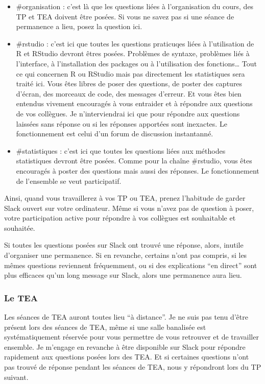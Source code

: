 \documentclass[a4paperpaper,]{article}
\providecommand{\tightlist}{%
  \setlength{\itemsep}{0pt}\setlength{\parskip}{0pt}}
\theoremstyle{definition}
\theoremstyle{definition}
\theoremstyle{definition}
\theoremstyle{remark}
\begin{document}
\begin{itemize}
\tightlist
\item
  \#organisation : c'est là que les questions liées à l'organisation du
  cours, des TP et TEA doivent être posées. Si vous ne savez pas si une
  séance de permanence a lieu, posez la question ici.
\item
  \#rstudio : c'est ici que toutes les questions praticuqes liées à
  l'utilisation de R et RStudio devront êtres posées. Problèmes de
  syntaxe, problèmes liés à l'interface, à l'installation des packages
  ou à l'utilisation des fonctions\ldots{} Tout ce qui concernen R ou
  RStudio mais pas directement les statistiques sera traité ici. Vous
  êtes libres de poser des questions, de poster des captures d'écran,
  des morceaux de code, des messages d'erreur. Et vous êtes bien
  entendus vivement encouragés à vous entraider et à répondre aux
  questions de vos collègues. Je n'interviendrai ici que pour répondre
  aux questions laissées sans réponse ou si les réponses apportées sont
  inexactes. Le fonctionnement est celui d'un forum de discussion
  instantanné.
\item
  \#statistiques : c'est ici que toutes les questions liées aux méthodes
  statistiques devront être posées. Comme pour la chaîne \#rstudio, vous
  êtes encouragés à poster des questions mais aussi des réponses. Le
  fonctionnement de l'ensemble se veut participatif.
\end{itemize}

Ainsi, quand vous travaillerez à vos TP ou TEA, prenez l'habitude de
garder Slack ouvert sur votre ordinateur. Même si vous n'avez pas de
question à poser, votre participation active pour répondre à vos
collègues est souhaitable et souhaitée.

Si toutes les questions posées sur Slack ont trouvé une réponse, alors,
inutile d'organiser une permanence. Si en revanche, certains n'ont pas
compris, si les mêmes questions reviennent fréquemment, ou si des
explications ``en direct'' sont plus efficaces qu'un long message sur
Slack, alors une permanence aura lieu.

\hypertarget{le-tea}{%
\subsubsection{Le TEA}\label{le-tea}}

Les séances de TEA auront toutes lieu ``à distance''. Je ne suis pas
tenu d'être présent lors des séances de TEA, même si une salle banalisée
est systématiquement réservée pour vous permettre de vous retrouver et
de travailler ensemble. Je m'engage en revanche à être disponible sur
Slack pour répondre rapidement aux questions posées lors des TEA. Et si
certaines questions n'ont pas trouvé de réponse pendant les séances de
TEA, nous y répondront lors du TP suivant.
\end{document}
